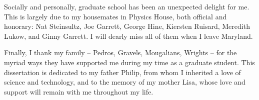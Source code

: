 Socially and personally, graduate school has been an unexpected delight for me. This is largely due to my housemates in Physics House, both official and honorary: Nat Steinsultz, Joe Garrett, George Hine, Kiersten Ruisard, Meredith Lukow, and Ginny Garrett. I will dearly miss all of them when I leave Maryland.

Finally, I thank my family -- Pedros, Gravels, Mougalians, Wrights -- for the myriad ways they have supported me during my time as a graduate student. This dissertation is dedicated to my father Philip, from whom I inherited a love of science and technology, and to the memory of my mother Lisa, whose love and support will remain with me throughout my life.